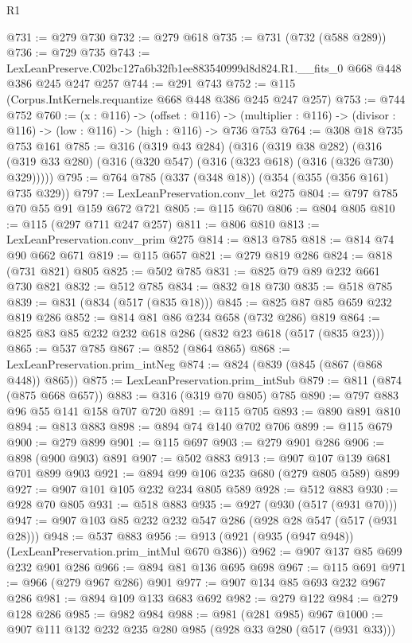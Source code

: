 \begin{lexlean}{R1}
\begin{coremodule}
@731 := @279 @730
@732 := @279 @618
@735 := @731 (@732 (@588 @289))
@736 := @729 @735
@743 := LexLeanPreserve.C02bc127a6b32fb1ee883540999d8d824.R1.__fits_0 @668 @448 @386 @245 @247 @257
@744 := @291 @743
@752 := @115 (Corpus.IntKernels.requantize @668 @448 @386 @245 @247 @257)
@753 := @744 @752
@760 := (x : @116) ->
  (offset : @116) ->
  (multiplier : @116) -> (divisor : @116) -> (low : @116) -> (high : @116) -> @736 @753
@764 := @308 @18 @735 @753 @161
@785 := @316
    (@319 @43 @284)
    (@316
      (@319 @38 @282)
      (@316 (@319 @33 @280) (@316 (@320 @547) (@316 (@323 @618) (@316 (@326 @730) @329)))))
@795 := @764 @785 (@337 (@348 @18)) (@354 (@355 (@356 @161) @735 @329))
@797 := LexLeanPreservation.conv_let @275
@804 := @797 @785 @70 @55 @91 @159 @672 @721
@805 := @115 @670
@806 := @804 @805
@810 := @115 (@297 @711 @247 @257)
@811 := @806 @810
@813 := LexLeanPreservation.conv_prim @275
@814 := @813 @785
@818 := @814 @74 @90 @662 @671
@819 := @115 @657
@821 := @279 @819 @286
@824 := @818 (@731 @821) @805
@825 := @502 @785
@831 := @825 @79 @89 @232 @661 @730 @821
@832 := @512 @785
@834 := @832 @18 @730
@835 := @518 @785
@839 := @831 (@834 (@517 (@835 @18)))
@845 := @825 @87 @85 @659 @232 @819 @286
@852 := @814 @81 @86 @234 @658 (@732 @286) @819
@864 := @825 @83 @85 @232 @232 @618 @286 (@832 @23 @618 (@517 (@835 @23)))
@865 := @537 @785
@867 := @852 (@864 @865)
@868 := LexLeanPreservation.prim_intNeg
@874 := @824 (@839 (@845 (@867 (@868 @448)) @865))
@875 := LexLeanPreservation.prim_intSub
@879 := @811 (@874 (@875 @668 @657))
@883 := @316 (@319 @70 @805) @785
@890 := @797 @883 @96 @55 @141 @158 @707 @720
@891 := @115 @705
@893 := @890 @891 @810
@894 := @813 @883
@898 := @894 @74 @140 @702 @706
@899 := @115 @679
@900 := @279 @899
@901 := @115 @697
@903 := @279 @901 @286
@906 := @898 (@900 @903) @891
@907 := @502 @883
@913 := @907 @107 @139 @681 @701 @899 @903
@921 := @894 @99 @106 @235 @680 (@279 @805 @589) @899
@927 := @907 @101 @105 @232 @234 @805 @589
@928 := @512 @883
@930 := @928 @70 @805
@931 := @518 @883
@935 := @927 (@930 (@517 (@931 @70)))
@947 := @907 @103 @85 @232 @232 @547 @286 (@928 @28 @547 (@517 (@931 @28)))
@948 := @537 @883
@956 := @913 (@921 (@935 (@947 @948)) (LexLeanPreservation.prim_intMul @670 @386))
@962 := @907 @137 @85 @699 @232 @901 @286
@966 := @894 @81 @136 @695 @698
@967 := @115 @691
@971 := @966 (@279 @967 @286) @901
@977 := @907 @134 @85 @693 @232 @967 @286
@981 := @894 @109 @133 @683 @692
@982 := @279 @122
@984 := @279 @128 @286
@985 := @982 @984
@988 := @981 (@281 @985) @967
@1000 := @907 @111 @132 @232 @235 @280 @985 (@928 @33 @280 (@517 (@931 @33)))

\end{coremodule}
\end{lexlean}
